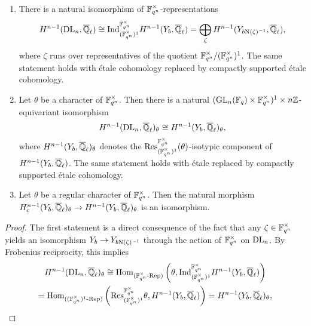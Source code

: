 \documentclass[../main.tex]{subfiles}
\begin{document}
\begin{lem}\label{lem:ResultsAboutYb}\leavevmode
  \begin{enumerate}
    \item There is a natural isomorphism of $\mathbb{F}_{q^n}^\times$-representations
      \begin{equation*}
         H^{n-1}(\mathrm{DL}_n, {\overline {\mathbb{Q}}_\ell}) \cong
         \mathrm{Ind}_{(\mathbb{F}_{q^n}^\times)^1}^{\mathbb{F}_{q^n}^\times}H^{n-1}(Y_b,
         {\overline {\mathbb{Q}}_\ell}) = \bigoplus_{\zeta} H^{n-1}(Y_{b
         \mathrm{N}(\zeta)^{-1}}, {\overline {\mathbb{Q}}_\ell}),
      \end{equation*}
      where $\zeta$ runs over representatives of the quotient
      $\mathbb{F}_{q^n}^\times/(\mathbb{F}_{q^n}^\times)^1$. The same
      statement holds with \'etale cohomology replaced by
      compactly supported \'etale cohomology.
    \item Let $\theta$ be a character of $\mathbb{F}_{q^n}^\times$.
      Then there is a natural $(\operatorname{GL}_n(\mathbb{F}_q) \times
      \mathbb{F}_{q^n}^\times)^1 \times n\mathbb{Z}$-equivariant isomorphism 
      \begin{equation*}
        H^{n-1}(\mathrm{DL}_n, {\overline {\mathbb{Q}}_\ell})_\theta \cong 
        H^{n-1}(Y_b, {\overline {\mathbb{Q}}_\ell})_\theta,
      \end{equation*}
      where $H^{n-1}(Y_b, {\overline {\mathbb{Q}}_\ell})_\theta$ denotes the
      $\mathrm{Res}_{(\mathbb{F}_{q^n}^\times)^1}^{\mathbb{F}_{q^n}^\times} (\theta)$-isotypic component of
      $H^{n-1}(Y_b, {\overline {\mathbb{Q}}_\ell})$.
      The same statement holds with \'etale replaced by compactly supported
      \'etale cohomology.
    \item Let $\theta$ be a regular character of $\mathbb{F}_{q^n}^\times$. Then 
      the natural morphism $H_c^{n-1}(Y_b, {\overline {\mathbb{Q}}_\ell})_\theta \to H^{n-1}(Y_b,
      {\overline {\mathbb{Q}}_\ell})_\theta$
      is an isomorphism.
  \end{enumerate}
\begin{proof}
  The first statement is a direct consequence of the fact that any $\zeta \in
  \mathbb{F}_{q^n}^{\times}$ yields an isomorphism $Y_b \to Y_{b \mathrm{N}(\zeta)^{-1}}$
  through the action of $\mathbb{F}_{q^n}^\times$ on $\mathrm{DL}_n$. 
  By Frobenius reciprocity, this implies
\begin{multline*}
      H^{n-1}(\mathrm{DL}_n, {\overline {\mathbb{Q}}_\ell})_\theta \cong 
      \operatorname{Hom}_{{({\mathbb{F}_{q^n}^\times}\text-\allowbreak\mathrm{Rep})}}\left(\theta,
      \mathrm{Ind}_{(\mathbb{F}_{q^n}^\times)^1}^{\mathbb{F}_{q^n}^\times}H^{n-1}(Y_b, {\overline {\mathbb{Q}}_\ell}) \right) \\
      = 
      \operatorname{Hom}_{{({(\mathbb{F}_{q^n}^\times)^1}\text-\allowbreak\mathrm{Rep})}}
      \left(\mathrm{Res}^{\mathbb{F}_{q^n}^\times}_{(\mathbb{F}_{q^n}^\times)^1} \theta,
        H^{n-1}(Y_b, {\overline {\mathbb{Q}}_\ell}) \right) = H^{n-1}(Y_b, {\overline {\mathbb{Q}}_\ell})_\theta,
\end{multline*}

\end{proof}
\end{lem}
\end{document}
